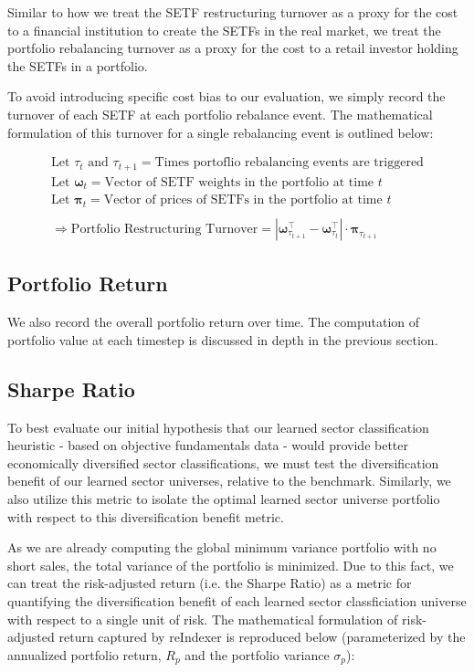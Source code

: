 \documentclass[../main.tex]{subfiles}
\begin{document}
Similar to how we treat the SETF restructuring turnover as a proxy for the cost to a financial institution to create the SETFs in the real market, we treat the portfolio rebalancing turnover as a proxy for the cost to a retail investor holding the SETFs in a portfolio.

To avoid introducing specific cost bias to our evaluation, we simply record the turnover of each SETF at each portfolio rebalance event. The mathematical formulation of this turnover for a single rebalancing event is outlined below:

\begin{gather*}
    \text{Let $\tau_t$ and $\tau_{t+1}$} = \text{Times portoflio rebalancing events are triggered} \\
    \text{Let $\boldsymbol{\omega}_t$} = \text{Vector of SETF weights in the portfolio at time $t$} \\
    \text{Let $\boldsymbol{\pi}_t$} = \text{Vector of prices of SETFs in the portfolio at time $t$} \\
    \\
    \Rightarrow \text{Portfolio Restructuring Turnover} = \left| \boldsymbol{\omega}_{\tau_{t + 1}}^\intercal - \boldsymbol{\omega}_{\tau_t}^\intercal \right| \cdot \boldsymbol{\pi}_{\tau_{t+1}}
\end{gather*}

\subsection{Portfolio Return}

We also record the overall portfolio return over time. The computation of portfolio value at each timestep is discussed in depth in the previous section.

\subsection{Sharpe Ratio}

To best evaluate our initial hypothesis that our learned sector classification heuristic - based on objective fundamentals data - would provide better economically diversified sector classifications, we must test the diversification benefit of our learned sector universes, relative to the benchmark. Similarly, we also utilize this metric to isolate the optimal learned sector universe portfolio with respect to this diversification benefit metric.

As we are already computing the global minimum variance portfolio with no short sales, the total variance of the portfolio is minimized. Due to this fact, we can treat the risk-adjusted return (i.e. the Sharpe Ratio) as a metric for quantifying the diversification benefit of each learned sector classficiation universe with respect to a single unit of risk. The mathematical formulation of risk-adjusted return captured by reIndexer is reproduced below (parameterized by the annualized portfolio return, $R_p$ and the portfolio variance $\sigma_p$):
\end{document}
